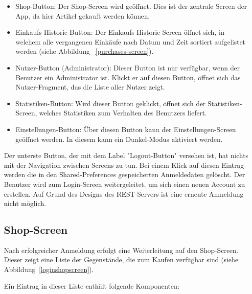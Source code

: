 \begin{itemize}
	\item Shop-Button: Der Shop-Screen wird geöffnet.
	Dies ist der zentrale Screen der App, da hier Artikel gekauft werden können.

	\item Einkaufs Historie-Button: Der Einkaufs-Historie-Screen öffnet sich, in welchem alle vergangenen Einkäufe nach Datum und Zeit sortiert aufgelistet werden (siehe Abbildung ~\ref{purchases-screen}).

	\item Nutzer-Button (Administrator): Dieser Button ist nur verfügbar, wenn der Benutzer ein Administrator ist.
	Klickt er auf diesen Button, öffnet sich das Nutzer-Fragment, das die Liste aller Nutzer zeigt.

	\item Statistiken-Button: Wird dieser Button geklickt, öffnet sich der Statistiken-Screen, welches Statistiken zum Verhalten des Benutzers liefert.

	\item Einstellungen-Button: Über diesen Button kann der Einstellungen-Screen geöffnet werden.
	In diesem kann ein Dunkel-Modus aktiviert werden.

\end{itemize}

Der unterste Button, der mit dem Label "Logout-Button" versehen ist, hat nichts mit der Navigation zwischen Screens zu tun.
Bei einem Klick auf diesen Eintrag werden die in den Shared-Preferences gespeicherten Anmeldedaten gelöscht.
Der Benutzer wird zum Login-Screen weitergeleitet, um sich einen neuen Account zu erstellen.
Auf Grund des Designs des REST-Servers ist eine erneute Anmeldung nicht möglich.

\subsection{Shop-Screen}\label{subsec:shop-screen}

Nach erfolgreicher Anmeldung erfolgt eine Weiterleitung auf den Shop-Screen.
Dieser zeigt eine Liste der Gegenstände, die zum Kaufen verfügbar sind (siehe Abbildung~\ref{loginshopscreen}).

Ein Eintrag in dieser Liste enthält folgende Komponenten:

